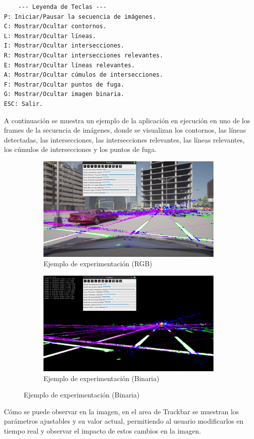 \begin{verbatim}
    --- Leyenda de Teclas ---
P: Iniciar/Pausar la secuencia de imágenes.
C: Mostrar/Ocultar contornos.
L: Mostrar/Ocultar líneas.
I: Mostrar/Ocultar intersecciones.
R: Mostrar/Ocultar intersecciones relevantes.
E: Mostrar/Ocultar líneas relevantes.
A: Mostrar/Ocultar cúmulos de intersecciones.
F: Mostrar/Ocultar puntos de fuga.
G: Mostrar/Ocultar imagen binaria.
ESC: Salir.
\end{verbatim}

A continuación se muestra un ejemplo de la aplicación en ejecución en uno de los frames de la secuencia de imágenes,
donde se visualizan los contornos, las líneas detectadas, las intersecciones, las intersecciones relevantes, las líneas relevantes,
los cúmulos de intersecciones y los puntos de fuga.

\begin{figure}[!ht]
    \begin{subfigure}{0.5\textwidth}
        \includegraphics[width=\textwidth]{img/reticule/experimentationRgb}
        \caption{Ejemplo de experimentación (RGB)}
        \label{fig:experimentationRgb}
    \end{subfigure}
    \begin{subfigure}{0.5\textwidth}
        \includegraphics[width=\textwidth]{img/reticule/experimentationBinary}
        \caption{Ejemplo de experimentación (Binaria)}
        \label{fig:experimentationBinary}
    \end{subfigure}
\end{figure}

Cómo se puede observar en la imagen, en el area de Trackbar se muestran los parámetros ajustables y su valor actual,
permitiendo al usuario modificarlos en tiempo real y observar el impacto de estos cambios en la imagen.
